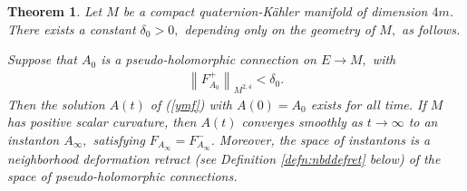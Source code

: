 \documentclass[12pt]{amsart}
\renewcommand{\1}{{\mathbf 1}}
\newtheorem{thm}{Theorem}[section]
\theoremstyle{others}
\numberwithin{equation}{section}
\begin{document}

\begin{thm}\label{thm:quaternionkahlergap}
Let $M$ be a compact quaternion-K\"ahler manifold of dimension \(4m\). There exists a constant $\delta_0 > 0,$ depending only on the geometry of $M,$ as follows.

Suppose that $A_0$ is a pseudo-holomorphic connection on $E \to M,$  with %
\begin{align}\label{quaternionkahler:energylessthandelta}
    \left\|F_{A_0}^+ \right\|_{M^{2, 4}} < \delta_0.
\end{align}
Then the solution \(A(t)\) of (\ref{ymf}) with $A(0) = A_0$ exists for all time. If $M$ has positive scalar curvature, then $A(t)$ converges smoothly as \(t \to \infty\) to an instanton $A_\infty,$ satisfying $F_{A_\infty} = F_{A_\infty}^{-}.$ Moreover, the space of %
instantons is a neighborhood deformation retract (see Definition \ref{defn:nbddefret} below) of the space of pseudo-holomorphic connections.
\end{thm}












\vspace{5mm}
\end{document}
